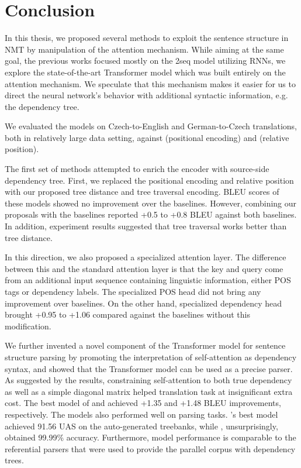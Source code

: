 \chapter*{Conclusion}

In this thesis, we proposed several methods to exploit the sentence structure in NMT by manipulation of the attention mechanism.
While aiming at the same goal, the previous works focused mostly on the \seq2seq model utilizing RNNs, we explore the state-of-the-art Transformer model which was built entirely on the attention mechanism.
We speculate that this mechanism makes it easier for us to direct the neural network's behavior with additional syntactic information, e.g. the dependency tree.

We evaluated the models on Czech-to-English and German-to-Czech translations, both in relatively large data setting, against \transformerbase (positional encoding) and \transformerrel (relative position).

The first set of methods attempted to enrich the encoder with source-side dependency tree.
First, we replaced the positional encoding and relative position with our proposed tree distance and tree traversal encoding.
BLEU scores of these models showed no improvement over the baselines.
However, combining our proposals with the baselines reported +0.5 to +0.8 BLEU against both baselines.
In addition, experiment results suggested that tree traversal works better than tree distance.

In this direction, we also proposed a specialized attention layer.
The difference between this and the standard attention layer is that the key and query come from an additional input sequence containing linguistic information, either POS tags or dependency labels.
The specialized POS head did not bring any improvement over baselines.
On the other hand, specialized dependency head brought +0.95 to +1.06 compared against the baselines without this modification.

We further invented a novel component of the Transformer model for sentence structure parsing by promoting the interpretation of self-attention as dependency syntax, and showed that the Transformer model can be used as a precise parser.
As suggested by the results, constraining self-attention to both true dependency as well as a simple diagonal matrix helped translation task at insignificant extra cost.
The best model of \DepParse and \DiagonalParse achieved +1.35 and +1.48 BLEU improvements, respectively. 
The models also performed well on parsing tasks.
\DepParse's best model achieved 91.56 UAS on the auto-generated treebanks, while \DiagonalParse, unsurprisingly, obtained 99.99\% accuracy.
Furthermore, \DepParse model performance is comparable to the referential parsers that were used to provide the parallel corpus with dependency trees.

